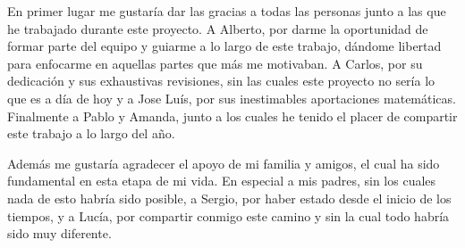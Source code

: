 En primer lugar me gustaría dar las gracias a todas las personas junto a las que
he trabajado durante este proyecto.
A Alberto, por darme la oportunidad de formar parte del equipo y
guiarme a lo largo de este trabajo, dándome libertad
para enfocarme en aquellas partes que más me motivaban. A Carlos, por su dedicación
y sus exhaustivas revisiones, sin las cuales este proyecto no sería lo que es
a día de hoy y a Jose Luís, por sus inestimables aportaciones
matemáticas. Finalmente a Pablo y Amanda, junto a los
cuales he tenido el placer de compartir este trabajo a lo largo del año.

Además me gustaría agradecer el apoyo de mi familia y amigos, el cual ha
sido fundamental en esta etapa de mi vida. En especial a mis padres, sin los
cuales nada de esto habría sido posible, a Sergio, por haber estado
desde el inicio de los tiempos, y a Lucía, por compartir conmigo este
camino y sin la cual todo habría sido muy diferente.
